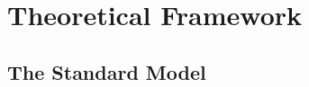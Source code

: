 \graphicspath{{\subfix{../images/}}}
\doublespacing

\chapter{Theoretical Framework}
\label{chapter-1.5}

\section{The Standard Model}


